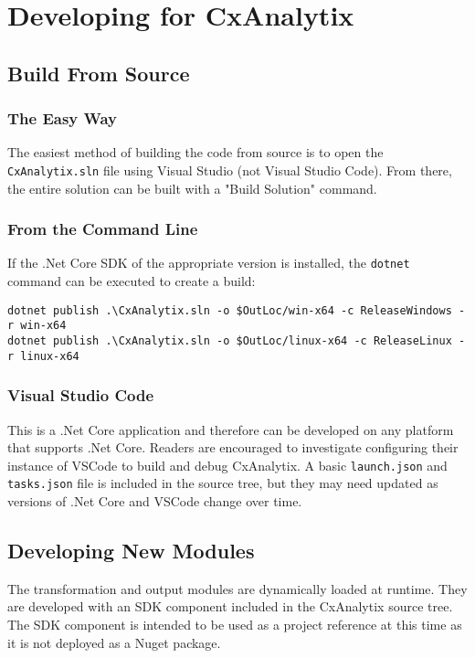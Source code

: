\chapter{Developing for CxAnalytix}

\section{Build From Source}

\subsection{The Easy Way}
The easiest method of building the code from source is to open the \texttt{CxAnalytix.sln} file using Visual Studio (not Visual Studio Code).
From there, the entire solution can be built with a "Build Solution" command.

\subsection{From the Command Line}
If the .Net Core SDK of the appropriate version is installed, the \texttt{dotnet} command can be executed to create a build:

\begin{lstlisting}
dotnet publish .\CxAnalytix.sln -o $OutLoc/win-x64 -c ReleaseWindows -r win-x64
dotnet publish .\CxAnalytix.sln -o $OutLoc/linux-x64 -c ReleaseLinux -r linux-x64
\end{lstlisting}

\subsection{Visual Studio Code}
This is a .Net Core application and therefore can be developed on any platform that supports .Net Core.  Readers are encouraged to investigate configuring
their instance of VSCode to build and debug CxAnalytix.  A basic \texttt{launch.json} and \texttt{tasks.json} file is included in the source tree, but they may need
updated as versions of .Net Core and VSCode change over time.


\section{Developing New Modules}

The transformation and output modules are dynamically loaded at runtime.  They are developed with an SDK component included in the CxAnalytix source tree.
The SDK component is intended to be used as a project reference at this time as it is not deployed as a Nuget package.

